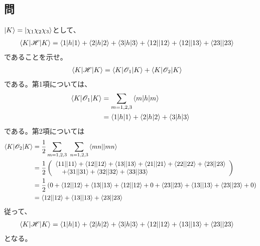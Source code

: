 \subsection{問}
$\ket{K}=\ket{\chi_1\chi_2\chi_3}$として、
\begin{align}
	\braket{K|{\mathscr{H}}|K}
&=
	\braket{1|h|1}
	+
	\braket{2|h|2}
	+
	\braket{3|h|3}
	+
	{\braket{12||12}}
	+
	{\braket{12||13}}
	+
	{\braket{23||23}}
\end{align}
であることを示せ。
\begin{align}
	\braket{K|{\mathscr{H}}|K}
&=
	\braket{K|{\mathscr{O}_1}|K}
	+
	\braket{K|{\mathscr{O}_2}|K}
\end{align}
である。第1項については、
\begin{align}
	\braket{K|\Oone|K}
&=
	\sum_{m=1,2,3} \braket{m|h|m} \\
%
%
&=
	\braket{1|h|1}
	+
	\braket{2|h|2}
	+
	\braket{3|h|3}
\end{align}
である。第2項については
\begin{align}
	\braket{K|\Otwo|K}
&=
	\frac{1}{2}
	\sum_{m=1,2,3}\ \sum_{n=1,2,3}
		\antitwo{mn}{mn} \\
%
%
&=
	\frac{1}{2}
	\left(
	\begin{array}{l}
		\antitwo{11}{11}
		+
		\antitwo{12}{12}
		+
		\antitwo{13}{13}
		+
		\antitwo{21}{21}
		+
		\antitwo{22}{22}
		+
		\antitwo{23}{23} \\ \quad
		+
		\antitwo{31}{31}
		+
		\antitwo{32}{32}
		+
		\antitwo{33}{33}
	\end{array}
	\right) \\
%
%
&=
	\frac{1}{2}
	\left(
		0
		+
		\antitwo{12}{12}
		+
		\antitwo{13}{13}
		+
		\antitwo{12}{12}
		+
		0
		+
		\antitwo{23}{23}
		+
		\antitwo{13}{13}
		+
		\antitwo{23}{23}
		+
		0
	\right) \\
%
%
&=
	\antitwo{12}{12}
	+
	\antitwo{13}{13}
	+
	\antitwo{23}{23}
\end{align}
従って、
\begin{align}
	\braket{K|{\mathscr{H}}|K}
&=
	\braket{1|h|1}
	+
	\braket{2|h|2}
	+
	\braket{3|h|3}
	+
	{\braket{12||12}}
	+
	{\braket{13||13}}
	+
	{\braket{23||23}}
\end{align}
となる。


